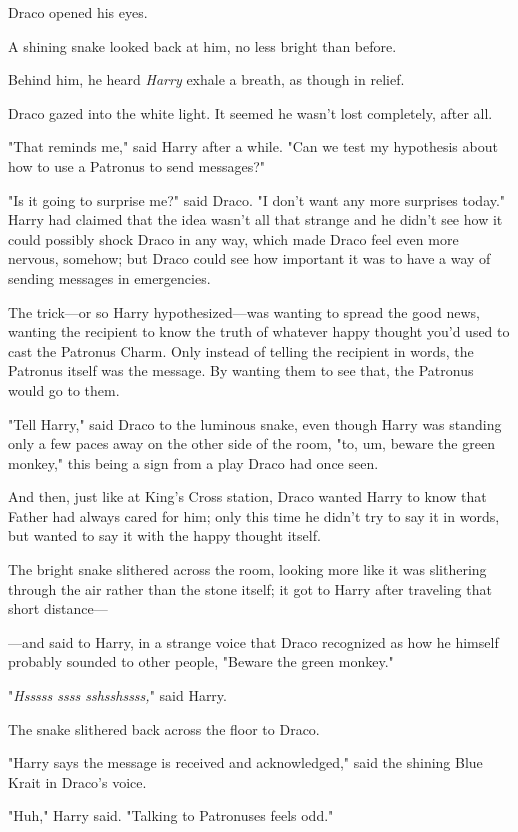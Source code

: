 Draco opened his eyes.

A shining snake looked back at him, no less bright than before.

Behind him, he heard \emph{Harry} exhale a breath, as though in relief.

Draco gazed into the white light. It seemed he wasn't lost completely, after
all.

"That reminds me," said Harry after a while. "Can we test my hypothesis about
how to use a Patronus to send messages?"

"Is it going to surprise me?" said Draco. "I don't want any more surprises
today."
\sbreak
Harry had claimed that the idea wasn't all that strange and he didn't see how
it could possibly shock Draco in any way, which made Draco feel even more
nervous, somehow; but Draco could see how important it was to have a way of
sending messages in emergencies.

The trick---or so Harry hypothesized---was wanting to spread the good news,
wanting the recipient to know the truth of whatever happy thought you'd used to
cast the Patronus Charm. Only instead of telling the recipient in words, the
Patronus itself was the message. By wanting them to see that, the Patronus
would go to them.

"Tell Harry," said Draco to the luminous snake, even though Harry was standing
only a few paces away on the other side of the room, "to, um, beware the green
monkey," this being a sign from a play Draco had once seen.

And then, just like at King's Cross station, Draco wanted Harry to know that
Father had always cared for him; only this time he didn't try to say it in
words, but wanted to say it with the happy thought itself.

The bright snake slithered across the room, looking more like it was slithering
through the air rather than the stone itself; it got to Harry after traveling
that short distance---

---and said to Harry, in a strange voice that Draco recognized as how he
himself probably sounded to other people, "Beware the green monkey."

"\emph{Hsssss ssss sshsshssss,}" said Harry.

The snake slithered back across the floor to Draco.

"Harry says the message is received and acknowledged," said the shining Blue
Krait in Draco's voice.

"Huh," Harry said. "Talking to Patronuses feels odd."


